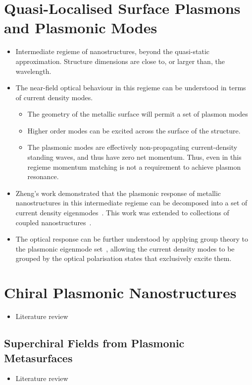 \section{Quasi-Localised Surface Plasmons and Plasmonic Modes}
\begin{itemize}
    \item Intermediate regieme of nanostructures, beyond the quasi-static approximation. Structure dimensions are close to, or larger than, the wavelength.
    \item The near-field optical behaviour in this regieme can be understood in terms of current density modes. 
    \begin{itemize}
        \item The geometry of the metallic surface will permit a set of plasmon modes
        \item Higher order modes can be excited across the surface of the structure. 
        \item The plasmonic modes are effectively non-propagating current-density standing waves, and thus have zero net momentum. Thus, even in this regieme momentum matching is not a requirement to achieve plasmon resonance.
    \end{itemize}
    \item Zheng's work demonstrated that the plasmonic response of metallic nanostructures in this intermediate regieme can be decomposed into a set of current density eigenmodes~\cite{Zheng2012}. This work was extended to collections of coupled nanostructures~\cite{Zheng2013}. 
    \item The optical response can be further understood by applying group theory to the plasmonic eigenmode set~\cite{Zheng2015}, allowing the current density modes to be grouped by the optical polarisation states that exclusively excite them.
\end{itemize}

\section{Chiral Plasmonic Nanostructures}
\begin{itemize}
    \item Literature review
\end{itemize}

\subsection{Superchiral Fields from Plasmonic Metasurfaces}
\begin{itemize}
    \item Literature review
\end{itemize}